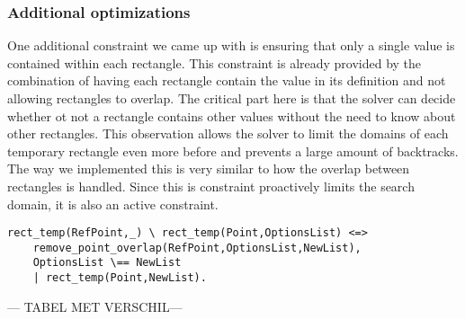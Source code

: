 \subsubsection{Additional optimizations}

One additional constraint we came up with is ensuring that only a single value is contained within each rectangle. This constraint is already provided by the combination of having each rectangle contain the value in its definition and not allowing rectangles to overlap. The critical part here is that the solver can decide whether ot not a rectangle contains other values without the need to know about other rectangles. This observation allows the solver to limit the domains of each temporary rectangle even more before and prevents a large amount of backtracks. The way we implemented this is very similar to how the overlap between rectangles is handled. Since this is constraint proactively limits the search domain, it is also an active constraint.

\begin{lstlisting}
rect_temp(RefPoint,_) \ rect_temp(Point,OptionsList) <=>
	remove_point_overlap(RefPoint,OptionsList,NewList),
	OptionsList \== NewList
	| rect_temp(Point,NewList).
\end{lstlisting}

--- TABEL MET VERSCHIL--- \\ \\

